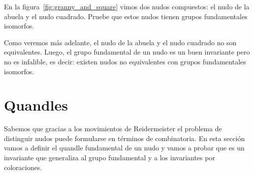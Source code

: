 \documentclass[graybox]{svmult}
\begin{document}
\begin{exercise}
    \label{exercise:granny_and_square}
	En la figura~\ref{fig:granny_and_square} vimos dos nudos compuestos: el
	nudo de la abuela y el nudo cuadrado.  Pruebe que estos nudos tienen grupos
	fundamentales isomorfos. 
\end{exercise}

Como veremos más adelante, el nudo de la abuela y el nudo cuadrado no son
equivalentes. Luego, el grupo fundamental de un nudo es un buen invariante
pero no es infalible, es decir: existen nudos no equivalentes con grupos
fundamentales isomorfos. 

\section{Quandles}
\label{section:quandles}

Sabemos que gracias a los movimientos de Reidermeister el problema de
distinguir nudos puede formularse en términos de combinatoria. En esta
sección vamos a definir el quandle fundamental de un nudo y vamos a probar que
es un invariante que generaliza al grupo fundamental y a los invariantes por
coloraciones.
\end{document}
